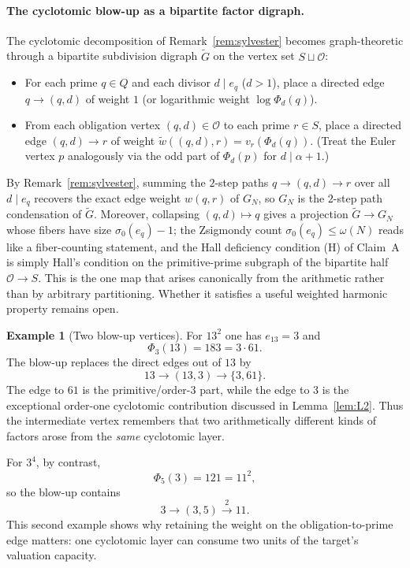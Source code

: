 \documentclass[11pt]{article}
\theoremstyle{definition}
\newtheorem{example}[theorem]{Example}
\theoremstyle{remark}
\begin{document}
\paragraph{The cyclotomic blow-up as a bipartite factor digraph.}
The cyclotomic decomposition of Remark~\ref{rem:sylvester} becomes
graph-theoretic through a bipartite subdivision digraph
$\widetilde G$ on the vertex set $S\sqcup\mathcal O$:
\begin{itemize}[leftmargin=1.5em]
\item For each prime $q\in Q$ and each divisor $d\mid e_q$ ($d>1$),
  place a directed edge $q\to(q,d)$ of weight $1$ (or logarithmic weight
  $\log\Phi_d(q)$).
\item From each obligation vertex $(q,d)\in\mathcal O$ to each prime
  $r\in S$, place a directed edge $(q,d)\to r$ of weight
  $\widetilde w((q,d),r)=v_r(\Phi_d(q))$. (Treat the Euler vertex $p$
  analogously via the odd part of $\Phi_d(p)$ for $d\mid\alpha+1$.)
\end{itemize}
By Remark~\ref{rem:sylvester}, summing the $2$-step paths $q\to(q,d)\to r$
over all $d\mid e_q$ recovers the exact edge weight $w(q,r)$ of $G_N$,
so $G_N$ is the $2$-step path condensation of $\widetilde G$. Moreover,
collapsing $(q,d)\mapsto q$ gives a projection $\widetilde G\to G_N$
whose fibers have size $\sigma_0(e_q)-1$; the Zsigmondy count
$\sigma_0(e_q)\le\omega(N)$ reads like a fiber-counting statement, and the
Hall deficiency condition (H) of Claim~A is simply Hall's condition on
the primitive-prime subgraph of the bipartite half $\mathcal O\to S$.
This is the one map that arises canonically from the arithmetic rather
than by arbitrary partitioning. Whether it satisfies a useful weighted
harmonic property remains open.

\begin{example}[Two blow-up vertices]
For $13^2$ one has $e_{13}=3$ and
\[
\Phi_3(13)=183=3\cdot61.
\]
The blow-up replaces the direct edges out of $13$ by
\[
13\longrightarrow(13,3)\longrightarrow\{3,61\}.
\]
The edge to $61$ is the primitive/order-$3$ part, while the edge to $3$ is
the exceptional order-one cyclotomic contribution discussed in
Lemma~\ref{lem:L2}.  Thus the intermediate vertex remembers that two
arithmetically different kinds of factors arose from the \emph{same}
cyclotomic layer.

For $3^4$, by contrast,
\[
\Phi_5(3)=121=11^2,
\]
so the blow-up contains
\[
3\longrightarrow(3,5)\stackrel{2}{\longrightarrow}11.
\]
This second example shows why retaining the weight on the obligation-to-prime
edge matters: one cyclotomic layer can consume two units of the target's
valuation capacity.
\end{example}
\end{document}
